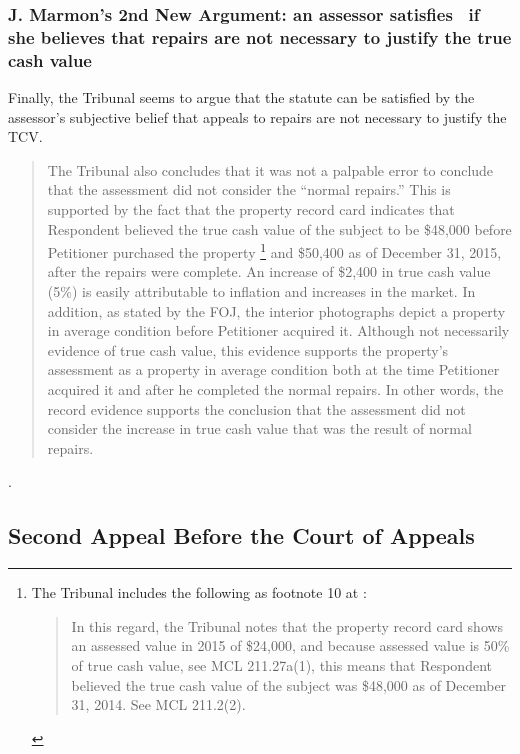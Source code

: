 \documentclass[12pt,\documentclassflag]{michiganCourtOfAppealsBrief}
\begin{document}
\subsubsection{J. Marmon's 2nd New Argument: an assessor satisfies \mathieuGast\ if she believes that repairs are not necessary to justify the true cash value}

 Finally, the Tribunal seems to argue that the statute can be satisfied by the assessor's subjective belief that appeals to repairs are not necessary to justify the TCV.

  \begin{quote}
    The Tribunal also concludes that it was not a palpable error to conclude that the
assessment did not consider the ``normal repairs.'' This is supported by the fact that the
property record card indicates that Respondent believed the true cash value of the
subject to be \$48,000 before Petitioner purchased the property
\footnote{The Tribunal includes the following as footnote 10 at :
  \begin{quote}
    In this regard, the Tribunal notes that the property record card shows an assessed value in 2015 of
\$24,000, and because assessed value is 50\% of true cash value, see MCL 211.27a(1), this means that
Respondent believed the true cash value of the subject was \$48,000 as of December 31, 2014. See
MCL 211.2(2).
\end{quote}
}
and \$50,400 as of
December 31, 2015, after the repairs were complete. An increase of \$2,400 in true
cash value (5\%) is easily attributable to inflation and increases in the market. In
addition, as stated by the FOJ, the interior photographs depict a property in average
condition before Petitioner acquired it. Although not necessarily evidence of true cash
value, this evidence supports the property's assessment as a property in average
condition both at the time Petitioner acquired it and after he completed the normal
repairs. In other words, the record evidence supports the conclusion that the
assessment did not consider the increase in true cash value that was the result of
normal repairs.
\end{quote}

.

\subsection{Second Appeal Before the Court of Appeals}
\end{document}
